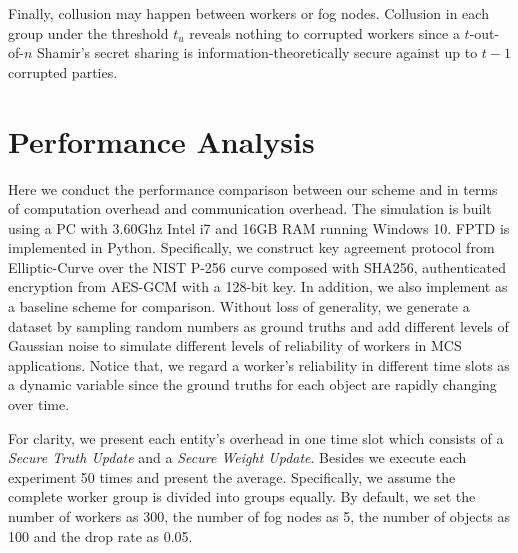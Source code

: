 \documentclass[conference,a4paper]{IEEEtran}
\begin{document}
    Finally, collusion may happen between workers or fog nodes. Collusion in each group under the threshold $t_u$ reveals nothing to corrupted workers since a $t$-out-of-$n$ Shamir's secret sharing is information-theoretically secure against up to $t-1$ corrupted parties.


\section{Performance Analysis}\label{performance}
    Here we conduct the performance comparison between our scheme and \cite{rtpt} in terms of computation overhead and communication overhead.
    The simulation is built using a PC with 3.60Ghz Intel i7 and 16GB RAM running Windows 10. FPTD is implemented in Python. Specifically, we construct key agreement protocol from Elliptic-Curve over the NIST P-256 curve composed with SHA256, authenticated encryption from AES-GCM with a 128-bit key. In addition, we also implement \cite{rtpt} as a baseline scheme for comparison.
    Without loss of generality, we generate a dataset by sampling random numbers as ground truths and add different levels of Gaussian noise to simulate different levels of reliability of workers in MCS applications. Notice that, we regard a worker's reliability in different time slots as a dynamic variable since the ground truths for each object are rapidly changing over time.

     For clarity, we present each entity's overhead in one time slot which consists of a {\em Secure Truth Update} and a {\em Secure Weight Update}. Besides we execute each experiment 50 times and present the average. Specifically, we assume the complete worker group is divided into groups equally. By default, we set the number of workers as 300, the number of fog nodes as 5, the number of objects as 100 and the drop rate as 0.05.
\end{document}

